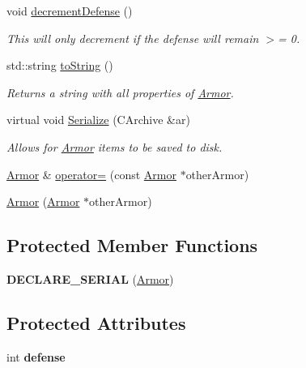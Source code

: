\begin{DoxyCompactItemize}
void \hyperlink{class_armor_a18ec027984c729af8580c79b050d57b8}{decrement\+Defense} ()
\begin{DoxyCompactList}\small\item\em This will only decrement if the defense will remain $>$= 0. \end{DoxyCompactList}\item 
\hypertarget{class_armor_a37ca0ee6bfab3321d7d5532d61aace2f}{}\label{class_armor_a37ca0ee6bfab3321d7d5532d61aace2f} 
std\+::string \hyperlink{class_armor_a37ca0ee6bfab3321d7d5532d61aace2f}{to\+String} ()
\begin{DoxyCompactList}\small\item\em Returns a string with all properties of \hyperlink{class_armor}{Armor}. \end{DoxyCompactList}\item 
\hypertarget{class_armor_a49d9af5d1a2d02e9dbf05d023f4a6515}{}\label{class_armor_a49d9af5d1a2d02e9dbf05d023f4a6515} 
virtual void \hyperlink{class_armor_a49d9af5d1a2d02e9dbf05d023f4a6515}{Serialize} (C\+Archive \&ar)
\begin{DoxyCompactList}\small\item\em Allows for \hyperlink{class_armor}{Armor} items to be saved to disk. \end{DoxyCompactList}\item 
\hyperlink{class_armor}{Armor} \& \hyperlink{class_armor_a167690954e4ccd6c4fd9adfed24bc132}{operator=} (const \hyperlink{class_armor}{Armor} $\ast$other\+Armor)
\item 
\hyperlink{class_armor_abee983c0e4e8fd5a5d3fccebc6d079dc}{Armor} (\hyperlink{class_armor}{Armor} $\ast$other\+Armor)
\end{DoxyCompactItemize}
\subsection*{Protected Member Functions}
\begin{DoxyCompactItemize}
\item 
\hypertarget{class_armor_a3a34973e61986f0d0623f5e80f8277df}{}\label{class_armor_a3a34973e61986f0d0623f5e80f8277df} 
{\bfseries D\+E\+C\+L\+A\+R\+E\+\_\+\+S\+E\+R\+I\+AL} (\hyperlink{class_armor}{Armor})
\end{DoxyCompactItemize}
\subsection*{Protected Attributes}
\begin{DoxyCompactItemize}
\item 
\hypertarget{class_armor_a15c6514c68303d572a71bf516cd1690b}{}\label{class_armor_a15c6514c68303d572a71bf516cd1690b} 
int {\bfseries defense}
\end{DoxyCompactItemize}


